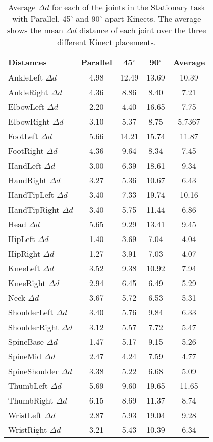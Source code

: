 \begin{table}[!htb]
\centering
\begin{tabularx}{1.0\columnwidth}{||X c c c c||} 
 \hline
 \textbf{Distances} & \textbf{Parallel} & \textbf{45$^{\circ}$} & \textbf{90$^{\circ}$} & \textbf{Average} \\ [0.5ex] 
 \hline\hline
 AnkleLeft $\Delta d$ & 4.98 & 12.49 & 13.69 & 10.39 \\
 \hline
 AnkleRight $\Delta d$ & 4.36 & 8.86 & 8.40 & 7.21 \\
 \hline
 ElbowLeft $\Delta d$ & 2.20 & 4.40 & 16.65 & 7.75 \\
 \hline
 ElbowRight $\Delta d$ & 3.10 & 5.37 & 8.75 & 5.7367 \\
 \hline
 FootLeft $\Delta d$ & 5.66 & 14.21 & 15.74 & 11.87 \\
 \hline
 FootRight $\Delta d$ & 4.36 & 9.64 & 8.34 & 7.45 \\
 \hline
 HandLeft $\Delta d$ & 3.00 & 6.39 & 18.61 & 9.34 \\
 \hline
 HandRight $\Delta d$ & 3.27 & 5.36 & 10.67 & 6.43 \\
 \hline
 HandTipLeft $\Delta d$ & 3.40 & 7.33 & 19.74 & 10.16 \\
 \hline
 HandTipRight $\Delta d$ & 3.40 & 5.75 & 11.44 & 6.86 \\
 \hline
 Head $\Delta d$ & 5.65 & 9.29 & 13.41 & 9.45 \\
 \hline
 HipLeft $\Delta d$ & 1.40 & 3.69 & 7.04 & 4.04 \\
 \hline
 HipRight $\Delta d$ & 1.27 & 3.91 & 7.03 & 4.07 \\
 \hline
 KneeLeft $\Delta d$ & 3.52 & 9.38 & 10.92 & 7.94 \\
 \hline
 KneeRight $\Delta d$ & 2.94 & 6.45 & 6.49 & 5.29 \\
 \hline
 Neck $\Delta d$ & 3.67 & 5.72 & 6.53 & 5.31 \\
 \hline
 ShoulderLeft $\Delta d$ & 3.40 & 5.76 & 9.84 & 6.33 \\
 \hline
 ShoulderRight $\Delta d$ & 3.12 & 5.57 & 7.72 & 5.47 \\
 \hline
 SpineBase $\Delta d$ & 1.47 & 5.17 & 9.15 & 5.26 \\
 \hline
 SpineMid $\Delta d$ & 2.47 & 4.24 & 7.59 & 4.77 \\
 \hline
 SpineShoulder $\Delta d$ & 3.38 & 5.22 & 6.68 & 5.09 \\
 \hline
 ThumbLeft $\Delta d$ & 5.69 & 9.60 & 19.65 & 11.65 \\
 \hline
 ThumbRight $\Delta d$ & 6.15 & 8.69 & 11.37 & 8.74 \\
 \hline
 WristLeft $\Delta d$ & 2.87 & 5.93 & 19.04 & 9.28 \\
 \hline
 WristRight $\Delta d$ & 3.21 & 5.43 & 10.39 & 6.34 \\
 \hline
\end{tabularx}
\caption{Average $\Delta d$ for each of the joints in the Stationary task with Parallel, 45$^{\circ}$ and 90$^{\circ}$ apart Kinects. The average shows the mean $\Delta d$ distance of each joint over the three different Kinect placements.}
\label{table:stationary_joints_values}
\end{table}

